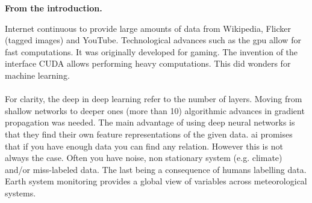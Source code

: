 \textbf{From the introduction.}

Internet continuous to provide large amounts of data from Wikipedia, Flicker (tagged images) and YouTube. Technological advances such as the \acrfull{gpu} allow for fast computations. It was originally developed for gaming. The invention of the interface CUDA allows performing heavy computations. This did wonders for machine learning.
\\ \\ 
For clarity, the deep in deep learning refer to the number of layers. Moving from shallow networks to deeper ones (more than 10) algorithmic advances in gradient propagation was needed. The main advantage of using deep neural networks is that they find their own feature representations of the given data. \acrfull{ai} promises that if you have enough data you can find any relation. However this is not always the case. Often you have noise, non stationary system (e.g. climate) and/or miss-labeled data. The last  being a consequence of humans labelling data. Earth system monitoring provides a global view of variables across meteorological systems. %




